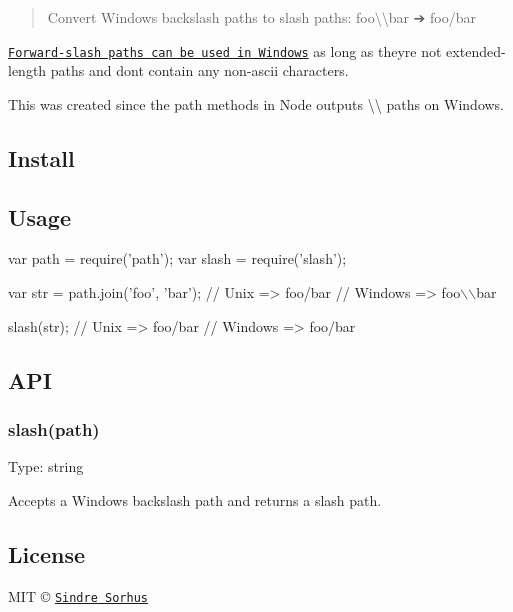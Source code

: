 \begin{quote}
Convert Windows backslash paths to slash paths\+: {\ttfamily foo\textbackslash{}\textbackslash{}bar} ➔ {\ttfamily foo/bar} \end{quote}


\href{http://superuser.com/a/176395/6877}{\tt Forward-\/slash paths can be used in Windows} as long as they\textquotesingle{}re not extended-\/length paths and don\textquotesingle{}t contain any non-\/ascii characters.

This was created since the {\ttfamily path} methods in Node outputs {\ttfamily \textbackslash{}\textbackslash{}} paths on Windows.

\subsection*{Install}




\subsection*{Usage}


\begin{DoxyCode}
var path = require('path');
var slash = require('slash');

var str = path.join('foo', 'bar');
// Unix    => foo/bar
// Windows => foo\(\backslash\)\(\backslash\)bar

slash(str);
// Unix    => foo/bar
// Windows => foo/bar
\end{DoxyCode}


\subsection*{A\+PI}

\subsubsection*{slash(path)}

Type\+: {\ttfamily string}

Accepts a Windows backslash path and returns a slash path.

\subsection*{License}

M\+IT © \href{http://sindresorhus.com}{\tt Sindre Sorhus} 